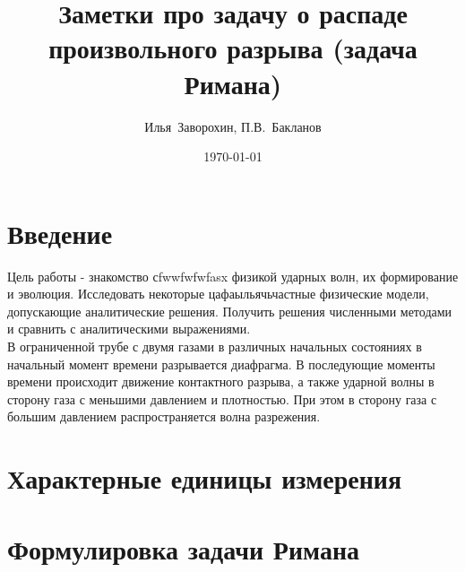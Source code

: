 \documentclass[a4paper,12pt]{extarticle}
\begin{document}
\title{\large
 Заметки про задачу о распаде произвольного разрыва (задача Римана)
}

\author{Илья~Заворохин, П.В.~Бакланов}

\date{\today}

\maketitle

\tableofcontents






\section{Введение}

Цель работы - знакомство сfwwfwfwfasx физикой ударных волн, их формирование и эволюция.
Исследовать некоторые цафаыльячьчастные физические модели, допускающие аналитические решения. 
Получить решения численными методами и сравнить с аналитическими выражениями.
\\

В ограниченной трубе с двумя газами в различных начальных состояниях в начальный момент времени разрывается диафрагма. В последующие моменты времени происходит движение контактного разрыва, а также ударной волны в сторону газа с меньшими давлением и плотностью. При этом в сторону газа с большим давлением распространяется волна разрежения.


\section{Характерные единицы измерения}


\section{Формулировка задачи Римана}
\end{document}
